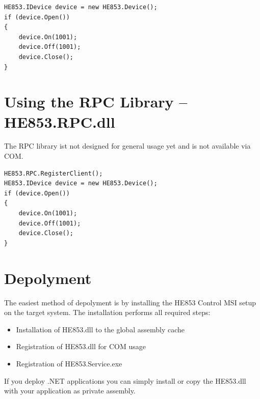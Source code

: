 \documentclass[
a4paper,
oneside,
halfparskip*,
normalheadings,
]
{scrbook}
\begin{document}
\begin{verbatim}
HE853.IDevice device = new HE853.Device();
if (device.Open())
{
    device.On(1001);
    device.Off(1001);
    device.Close();
}
\end{verbatim}

\section{Using the RPC Library -- HE853.RPC.dll}

The RPC library ist not designed for general usage yet and is not available via COM.

\begin{verbatim}
HE853.RPC.RegisterClient();
HE853.IDevice device = new HE853.Device();
if (device.Open())
{
    device.On(1001);
    device.Off(1001);
    device.Close();
}
\end{verbatim}

\section{Depolyment}
The easiest method of depolyment is by installing the HE853 Control MSI setup on the target
system. The installation performs all required steps:

\begin{itemize}
  \item Installation of HE853.dll to the global assembly cache
	\item Registration of HE853.dll for COM usage
	\item Registration of HE853.Service.exe
\end{itemize}

If you deploy .NET applications you can simply install or copy the HE853.dll with your application
as private assembly.
\end{document}
